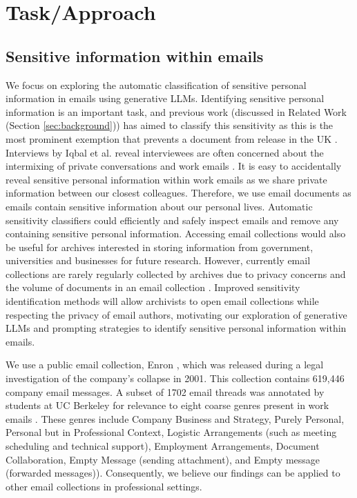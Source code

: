 \section{Task/Approach}
\subsection{Sensitive information within emails}
We focus on exploring the automatic classification of sensitive personal information in emails using generative LLMs. Identifying sensitive personal information is an important task, and previous work (discussed in Related Work (Section \ref{sec:background})) has aimed to classify this sensitivity as this is the most prominent exemption that prevents a document from release in the UK \cite{TNA:16}. Interviews by Iqbal et al. reveal interviewees are often concerned about the intermixing of private conversations and work emails \cite{iqbal2021search}. It is easy to accidentally reveal sensitive personal information within work emails as we share private information between our closest colleagues. Therefore, we use email documents as emails contain sensitive information about our personal lives. Automatic sensitivity classifiers could efficiently and safely inspect emails and remove any containing sensitive personal information. Accessing email collections would also be useful for archives interested in storing information from government, universities and businesses for future research. However, currently email collections are rarely regularly collected by archives due to privacy concerns and the volume of documents in an email collection \cite{TFTAEA:18}. Improved sensitivity identification methods will allow archivists to open email collections while respecting the privacy of email authors, motivating our exploration of generative LLMs and prompting strategies to identify sensitive personal information within emails.

We use a public email collection, Enron \cite{klimt2004enron}, which was released during a legal investigation of the company’s collapse in 2001. This collection contains 619,446 company email messages. A subset of 1702 email threads was annotated by students at UC Berkeley for relevance to eight coarse genres present in work emails \cite{hearst2005teaching}. These genres include Company Business and Strategy, Purely Personal, Personal but in Professional Context, Logistic Arrangements (such as meeting scheduling and technical support), Employment Arrangements, Document Collaboration, Empty Message (sending attachment), and Empty message (forwarded messages)). Consequently, we believe our findings can be applied to other email collections in professional settings.

